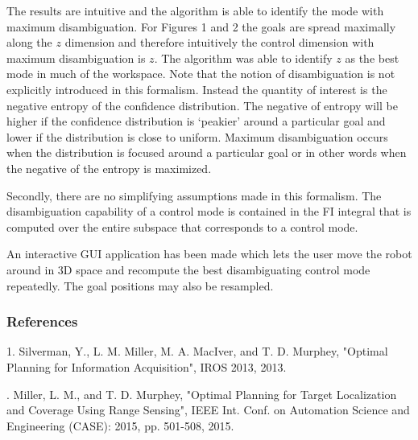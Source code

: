 \documentclass[]{article}
\begin{document}
The results are intuitive and the algorithm is able to identify the mode with maximum disambiguation. For Figures 1 and 2 the goals are spread maximally along the $z$ dimension and therefore intuitively the control dimension with maximum disambiguation is $z$. The algorithm was able to identify $z$ as the best mode in much of the workspace. Note that the notion of disambiguation is not explicitly introduced in this formalism. Instead the quantity of interest is the negative entropy of the confidence distribution. The negative of entropy will be higher if the confidence distribution is `peakier' around a particular goal and lower if the distribution is close to uniform. Maximum disambiguation occurs when the distribution is focused around a particular goal or in other words when the negative of the entropy is maximized. 

Secondly, there are no simplifying assumptions made in this formalism. The disambiguation capability of a control mode is contained in the FI integral that is computed over the entire subspace that corresponds to a control mode. 

An interactive GUI application has been made which lets the user move the robot around in 3D space and recompute the best disambiguating control mode repeatedly. The goal positions may also be resampled. 
%
%
%
%
\subsubsection*{References}
1. Silverman, Y., L. M. Miller, M. A. MacIver, and T. D. Murphey, "Optimal Planning for Information Acquisition", IROS 2013, 2013. 

. Miller, L. M., and T. D. Murphey, "Optimal Planning for Target Localization and Coverage Using Range Sensing", IEEE Int. Conf. on Automation Science and Engineering (CASE): 2015, pp. 501-508, 2015.  
\end{document}
